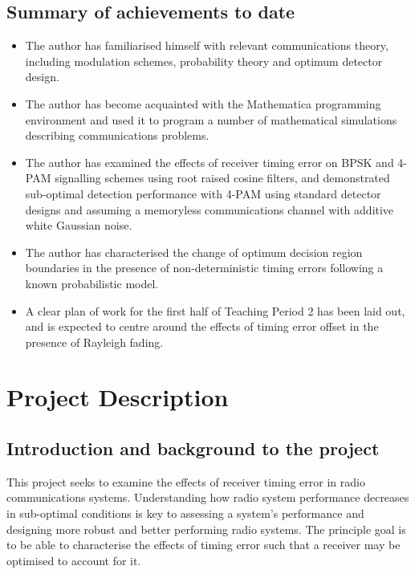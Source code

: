 \chapter{Summary of achievements to date}

\begin{itemize}
\itemsep1pt\parskip0pt
\item
  The author has familiarised himself with relevant communications
  theory, including modulation schemes, probability theory and optimum
  detector design.
\item
  The author has become acquainted with the Mathematica programming
  environment and used it to program a number of mathematical
  simulations describing communications problems.
\item
  The author has examined the effects of receiver timing error on BPSK
  and 4-PAM signalling schemes using root raised cosine filters, and
  demonstrated sub-optimal detection performance with 4-PAM using
  standard detector designs and assuming a memoryless communications
  channel with additive white Gaussian noise.
\item
  The author has characterised the change of optimum decision region
  boundaries in the presence of non-deterministic timing errors
  following a known probabilistic model.
\item
  A clear plan of work for the first half of Teaching Period 2 has been laid out,
  and is expected to centre around the effects of timing error offset in the
  presence of Rayleigh fading.
\end{itemize}


\part{Project Description}

\chapter{Introduction and background to the project}

This project seeks to examine the effects of receiver timing error in
radio communications systems. Understanding how radio system performance
decreases in sub-optimal conditions is key to assessing a system's
performance and designing more robust and better performing radio systems. The
principle goal is to be able to characterise the effects of timing error such
that a receiver may be optimised to account for it.

